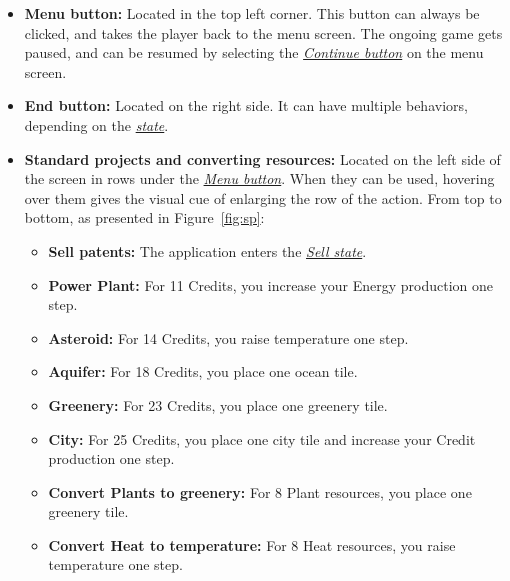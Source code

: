 \begin{itemize}
    \item \textbf{Menu button:}\label{user:usage:menu} Located in the top left corner. This button can always be clicked, and takes the player back to the menu screen. The ongoing game gets paused, and can be resumed by selecting the \hyperref[user:usage:continue]{\textit{Continue button}} on the menu screen.

    \item \textbf{End button:}\label{user:usage:end} Located on the right side. It can have multiple behaviors, depending on the \hyperref[user:usage:state]{\textit{state}}.

    \item \textbf{Standard projects and converting resources:} Located on the left side of the screen in rows under the \hyperref[user:usage:menu]{\textit{Menu button}}. When they can be used, hovering over them gives the visual cue of enlarging the row of the action. From top to bottom, as presented in Figure~\ref{fig:sp}:
    \begin{itemize}
        \item \textbf{Sell patents:}\label{user:usage:sell} The application enters the \hyperref[user:usage:sell_state]{\textit{Sell state}}.
        \item \textbf{Power Plant:} For 11 Credits, you increase your Energy production one step.
        \item \textbf{Asteroid:} For 14 Credits, you raise temperature one step.
        \item \textbf{Aquifer:} For 18 Credits, you place one ocean tile.
        \item \textbf{Greenery:} For 23 Credits, you place one greenery tile.
        \item \textbf{City:} For 25 Credits, you place one city tile and increase your Credit production one step.
        \item \textbf{Convert Plants to greenery:}\label{user:usage:convertplants} For 8 Plant resources, you place one greenery tile.
        \item \textbf{Convert Heat to temperature:} For 8 Heat resources, you raise temperature one step.
    \end{itemize}


\end{itemize}

